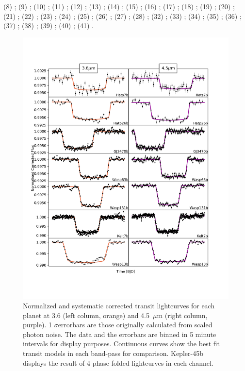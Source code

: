 \begin{subappendices}
{\begin{landscape}
{    (8) \citet{Doyle2011}; (9) \citet{Esteves2015}; (10) \citet{Faedi2011};
    (11) \citet{Hartman2009}; (12) \citet{Hartman2011b}; (13) \citet{Hartman2011};
    (14) \citet{Hartman2011c}; (15) \citet{Hoyer2013}; (16) \citet{Johnson2012};
    (17) \citet{Maciejewski2014}; (18) \citet{Maciejewski2016}; (19) \citet{Nikolov2014};
    (20) \citet{Petrucci2013}; (21) \citet{Seeliger2015}; (22) \citet{Sozzetti2007};
    (23) \citet{Mocnik2017}; (24) \citet{Barros2012}; (25) \citet{Skillen2009};
    (26) \citet{Delrez2016}; (27) \citet{Holman2010}; (28) \citet{Torres2011};
    (32) \citet{Stassun2017}; (33) \citet{Stassun2018}; (34) \citet{Stassun2019};
    (35) \citet{Anderson2014}; (36) \citet{Hellier2012}; (37) \citet{Bakos2015};
    (38) \citet{Hellier2010}; (39) \citet{Hellier2017}; (40) \citet{Mancini2016};
    (41) \citet{Neveu-VanMalle2014}.}
  \end{landscape}
  }



  \begin{figure}[!b]
    \includegraphics[trim={0 2cm 0 0},clip,width=\textwidth]{CorrectedLighctuves0.pdf}
    \caption{Normalized and systematic corrected transit lightcurves for each planet  at 3.6 (left column, orange) and 4.5~$\mu$m (right column, purple). 1 $\sigma$errorbars are those originally calculated from scaled photon noise. The data and the errorbars are binned in 5 minute intervals for display purposes. Continuous curves show the best fit transit models in each band-pass for comparison. Kepler-45b displays the result of 4 phase folded lightcurves in each channel.}
    \label{P1:fig:normlc}
  \end{figure}


\end{subappendices}
